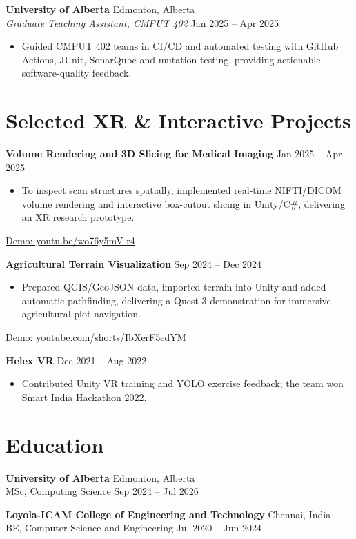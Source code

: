 \documentclass[10pt]{article}
\begin{document}
\textbf{University of Alberta}
\hfill Edmonton, Alberta\\
\textit{Graduate Teaching Assistant, CMPUT 402}
\hfill Jan 2025 -- Apr 2025

\begin{itemize}
    \item Guided CMPUT 402 teams in CI/CD and automated testing with GitHub Actions, JUnit, SonarQube and mutation testing, providing actionable software-quality feedback.
\end{itemize}

\section{Selected XR \& Interactive Projects}

\textbf{Volume Rendering and 3D Slicing for Medical Imaging}
\hfill Jan 2025 -- Apr 2025

\begin{itemize}
    \item To inspect scan structures spatially, implemented real-time NIFTI/DICOM volume rendering and interactive box-cutout slicing in Unity/C\#, delivering an XR research prototype.
\end{itemize}

{\small \href{https://youtu.be/wo76y5mV-r4}{Demo: youtu.be/wo76y5mV-r4}}

\textbf{Agricultural Terrain Visualization}
\hfill Sep 2024 -- Dec 2024

\begin{itemize}
    \item Prepared QGIS/GeoJSON data, imported terrain into Unity and added automatic pathfinding, delivering a Quest 3 demonstration for immersive agricultural-plot navigation.
\end{itemize}

{\small \href{https://youtube.com/shorts/IbXerF5edYM}{Demo: youtube.com/shorts/IbXerF5edYM}}

\textbf{Helex VR}
\hfill Dec 2021 -- Aug 2022

\begin{itemize}
    \item Contributed Unity VR training and YOLO exercise feedback; the team won Smart India Hackathon 2022.
\end{itemize}

\section{Education}

\textbf{University of Alberta}
\hfill Edmonton, Alberta\\
MSc, Computing Science
\hfill Sep 2024 -- Jul 2026

\textbf{Loyola-ICAM College of Engineering and Technology}
\hfill Chennai, India\\
BE, Computer Science and Engineering
\hfill Jul 2020 -- Jun 2024
\end{document}
